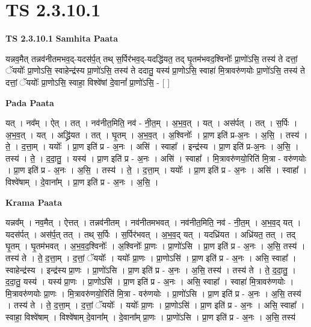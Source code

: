 \documentclass[17pt]{extarticle}
\begin{document}
\section{ TS 2.3.10.1 }

\textbf{TS 2.3.10.1 } \newline
\textbf{Samhita Paata} \newline

यन्नव॒मैत् तन्नव॑नीतमभव॒द्-यदस॑र्प॒त् तथ् स॒र्पिर॑भव॒द्-यदद्धि॑यत॒ तद् घृ॒तम॑भवद॒श्विनोः᳚ प्रा॒णो॑ऽसि॒ तस्य॑ ते दत्तां॒ ॅययोः᳚ प्रा॒णोऽसि॒ स्वाहेन्द्र॑स्य प्रा॒णो॑ऽसि॒ तस्य॑ ते ददातु॒ यस्य॑ प्रा॒णोऽसि॒ स्वाहा॑ मि॒त्रावरु॑णयोः प्रा॒णो॑ऽसि॒ तस्य॑ ते दत्तां॒ ॅययोः᳚ प्रा॒णोऽसि॒ स्वाहा॒ विश्वे॑षां दे॒वानां᳚ प्रा॒णो॑ऽसि॒ - [  ] \newline

\textbf{Pada Paata} \newline

यत् । नव᳚म् । ऐत् । तत् । नव॑नीत॒मिति॒ नव॑ - नी॒त॒म् । अ॒भ॒व॒त् । यत् । अस॑र्पत् । तत् । स॒र्पिः । अ॒भ॒व॒त् । यत् । अद्ध्रि॑यत । तत् । घृ॒तम् । अ॒भ॒व॒त् । अ॒श्विनोः᳚ । प्रा॒ण इति॑ प्र-अ॒नः । अ॒सि॒ । तस्य॑ । ते॒ । द॒त्ता॒म् । ययोः᳚ । प्रा॒ण इति॑ प्र - अ॒नः । असि॑ । स्वाहा᳚ । इन्द्र॑स्य । प्रा॒ण इति॑ प्र-अ॒नः । अ॒सि॒ । तस्य॑ । ते॒ । द॒दा॒तु॒ । यस्य॑ । प्रा॒ण इति॑ प्र - अ॒नः । असि॑ । स्वाहा᳚ । मि॒त्रावरु॑णयो॒रिति॑ मि॒त्रा - वरु॑णयोः । प्रा॒ण इति॑ प्र - अ॒नः । अ॒सि॒ । तस्य॑ । ते॒ । द॒त्ता॒म् । ययोः᳚ । प्रा॒ण इति॑ प्र - अ॒नः । असि॑ । स्वाहा᳚ । विश्वे॑षाम् । दे॒वाना᳚म् । प्रा॒ण इति॑ प्र - अ॒नः । अ॒सि॒ ।  \newline


\textbf{Krama Paata} \newline

यन्नव᳚म् । नव॒मैत् । ऐत्तत् । तन्नव॑नीतम् । नव॑नीतमभवत् । नव॑नीत॒मिति॒ नव॑ - नी॒त॒म् । अ॒भ॒व॒द् यत् । यदस॑र्पत् । अस॑र्प॒त् तत् । तथ् स॒र्पिः । स॒र्पिर॑भवत् । अ॒भ॒व॒द् यत् । यदध्रि॑यत । अध्रि॑यत॒ तत् । तद् घृ॒तम् । घृ॒तम॑भवत् । अ॒भ॒व॒द॒श्विनोः᳚ । अ॒श्विनोः᳚ प्रा॒णः । प्रा॒णो॑ऽसि । प्रा॒ण इति॑ प्र - अ॒नः । अ॒सि॒ तस्य॑ । तस्य॑ ते । ते॒ द॒त्ता॒म् । द॒त्तां॒ ॅययोः᳚ । ययोः᳚ प्रा॒णः । प्रा॒णोऽसि॑ । प्रा॒ण इति॑ प्र - अ॒नः । असि॒ स्वाहा᳚ । स्वाहेन्द्र॑स्य । इन्द्र॑स्य प्रा॒णः । प्रा॒णो॑ऽसि । प्रा॒ण इति॑ प्र - अ॒नः । अ॒सि॒ तस्य॑ । तस्य॑ ते । ते॒ द॒दा॒तु॒ । द॒दा॒तु॒ यस्य॑ । यस्य॑ प्रा॒णः । प्रा॒णोऽसि॑ । प्रा॒ण इति॑ प्र - अ॒नः । असि॒ स्वाहा᳚ । स्वाहा॑ मि॒त्रावरु॑णयोः । मि॒त्रावरु॑णयोः प्रा॒णः । मि॒त्रावरु॑णयो॒रिति॑ मि॒त्रा - वरु॑णयोः । प्रा॒णो॑ऽसि । प्रा॒ण इति॑ प्र - अ॒नः । अ॒सि॒ तस्य॑ । तस्य॑ ते । ते॒ द॒त्ता॒म् । द॒त्तां॒ ॅययोः᳚ । ययोः᳚ प्रा॒णः । प्रा॒णोऽसि॑ । प्रा॒ण इति॑ प्र - अ॒नः । असि॒ स्वाहा᳚ । स्वाहा॒ विश्वे॑षाम् । विश्वे॑षाम् दे॒वाना᳚म् । दे॒वाना᳚म् प्रा॒णः । प्रा॒णो॑ऽसि । प्रा॒ण इति॑ प्र - अ॒नः । अ॒सि॒ तस्य॑ \newline
\end{document}
